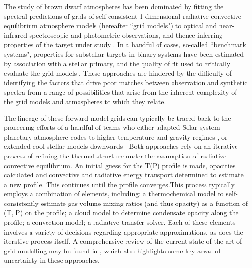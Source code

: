 \documentclass[useAMS,usenatbib]{mn2e}
\begin{document}
The study of brown dwarf atmospheres has been dominated by fitting the spectral predictions of grids of self-consistent 1-dimensional radiative-convective equilibrium atmosphere models (hereafter ``grid models") to optical and near-infrared spectroscopic and photometric observations,  and thence inferring properties of the target under study \citep[e.g.][]{cushing2008, manjavacas2014,rice2015}. In a handful of cases, so-called ``benchmark systems", properties for substellar targets in binary systems have been estimated by association with a stellar primary, and the quality of fit used to critically evaluate the grid models \citep[e.g.][]{ben2009,ben2011b,ben2013}.  These approaches are hindered by the difficulty of identifying the factors that drive poor matches between observation and synthetic spectra from a range of possibilities that arise from the inherent complexity of the grid models and atmospheres to which they relate. 

The lineage of these forward model grids can typically be traced back to the pioneering efforts of a handful of teams who either adapted Solar system planetary atmosphere codes to higher temperature and gravity regimes \citep[e.g. ][]{marley1996,saumon2012}, or extended cool stellar models downwards \citep[e.g.][]{allard1995,btsettlCS16,burrows1993,burrows2006,tsuji1996,tsuji2002}.  Both approaches rely on an iterative process of refining the thermal structure under the assumption of radiative-convective equilibrium.  An initial guess for the T(P) profile is made, opacities calculated and convective and radiative energy transport determined to estimate a new profile. This continues until the profile converges.This process typically employs a combination of elements, including: a thermochemical model to self-consistently estimate gas volume mixing ratios (and thus opacity) as a function of (T, P) on the profile; a cloud model to determine condensate opacity along the profile; a convection model; a radiative transfer solver.  Each of these elements involves a variety of decisions regarding appropriate approximations, as does the iterative process itself.  A comprehensive review of the current state-of-the-art of grid modelling may be found in \citet{marley2015}, which also highlights some key areas of uncertainty in these approaches.
\end{document}
